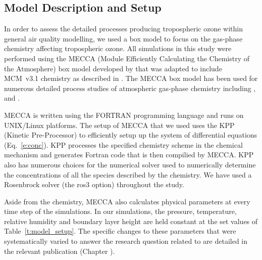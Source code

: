 \subsection{Model Description and Setup} \label{ss:model_setup}
In order to assess the detailed processes producing tropospheric ozone within general air quality modelling, we used a box model to focus on the gas-phase chemistry affecting tropospheric ozone.
All simulations in this study were performed using the MECCA (Module Efficiently Calculating the Chemistry of the Atmosphere) box model developed by \citet{Sander:2005} that was adapted to include MCM~v3.1 chemistry as described in \citet{Butler:2011}.
The MECCA box model has been used for numerous detailed process studies of atmospheric gas-phase chemistry including \citet{Kubistin:2010}, \citet{Xie:2008} and \citet{Lourens:2016}.

MECCA is written using the FORTRAN programming language and runs on UNIX/Linux platforms.
The setup of MECCA that we used uses the KPP (Kinetic Pre-Processor) \citep{Damian:2002} to efficiently setup up the system of differential equations (Eq.~\eqref{e:conc}).
KPP processes the specified chemistry scheme in the chemical mechanism and generates Fortran code that is then compilied by MECCA.
KPP also has numerous choices for the numerical solver used to numerically determine the concentrations of all the species described by the chemistry.
We have used a Rosenbrock solver (the ros3 option) throughout the study.

Aside from the chemistry, MECCA also calculates physical parameters at every time step of the simulations.
In our simulations, the pressure, temperature, relative humidity and boundary layer height are held constant at the set values of Table~\ref{t:model_setup}.
The specific changes to these parameters that were systematically varied to answer the research question related to  are detailed in the relevant publication (Chapter ). 

